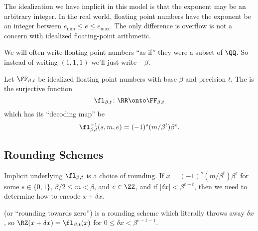 \begin{rmk}[On ``Idealization'']
  The idealization we have implicit in this model is that the exponent
  may be an arbitrary integer. In the real world, floating point numbers
  have the exponent be an integer between $e_{\text{min}}\leq e\leq e_{\text{max}}$.
  The only difference is overflow is not a concern with idealized
  floating-point arithmetic.
\end{rmk}

\begin{rmk}
We will often write floating point numbers ``as if'' they were a subset
of $\QQ$. So instead of writing $(1,1,1)$ we'll just write $-\beta$.
\end{rmk}

\begin{defn}
Let $\FF_{\beta,t}$ be idealized floating point numbers with base
$\beta$ and precision $t$. The  is the surjective
function
\begin{equation}
  \fl_{\beta,t}\colon\RR\onto\FF_{\beta,t}
\end{equation}
which has its ``decoding map'' be
\begin{equation}
  \fl_{\beta,t}^{-1}(s,m,e) = (-1)^{s}(m/\beta^{t})\beta^{e}.
\end{equation}
\end{defn}

\subsection{Rounding Schemes}

\begin{rmk}
  Implicit underlying $\fl_{\beta,t}$ is a choice of rounding. If
  $x = (-1)^{s}(m/\beta^{t})\beta^{e}$ for some $s\in\{0,1\}$,
  $\beta/2\leq m<\beta$, and $e\in\ZZ$, and if $|\delta x| < \beta^{e-t}$,
  then we need to determine how to encode $x + \delta x$.
\end{rmk}

\begin{defn}
   (or ``rounding towards zero'') is a rounding
  scheme which literally throws away
  $\delta x$, so
  $\RZ(x+\delta x)=\fl_{\beta,t}(x)$ for $0\leq\delta x<\beta^{e-t-1}$.
\end{defn}


